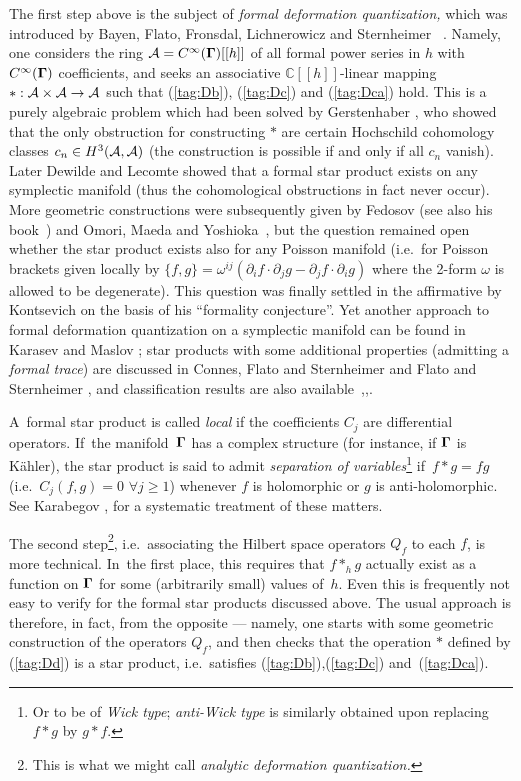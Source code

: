 \documentclass[12pt]{amsart}
\numberwithin{equation}{section}
\theoremstyle{remark}
\newcommand\AAA{{\Cal A}}
\newcommand\Omg{{\bigam}}   %
\newcommand{\CC}{\C}
\newcommand{\bigam}{\mbox{\boldmath $\Gamma$}}
\newcommand{\C}{\mathbb C}
\begin{document}
The first step above is the subject of {\it formal deformation quantization,\/}
which was introduced by Bayen, Flato, Fronsdal, Lichnerowicz and Sternheimer~
\cite{bib:BFFLS}. Namely, one considers the ring $\AAA=C^\infty(\Omg)[[h]]$ of
all formal power series in $h$ with $C^\infty(\Omg)$ coefficients, and seeks an
associative $\CC[[h]]$-linear mapping $*:\AAA\times\AAA\to\AAA$ such that
(\ref{tag:Db}), (\ref{tag:Dc}) and (\ref{tag:Dca}) hold. This is a purely
algebraic problem which had been solved by Gerstenhaber \cite{bib:Gerst}, who
showed that the only obstruction for constructing $*$ are certain Hochschild
cohomology classes $c_n\in H^3(\AAA,\AAA)$ (the construction is possible if and
only if all $c_n$ vanish). Later Dewilde and Lecomte \cite{bib:DewLe} showed
that a formal star product exists on any symplectic manifold (thus the
cohomological obstructions in fact never occur). More geometric constructions
were subsequently given by Fedosov \cite{bib:Fedos} (see also his
book~\cite{bib:FedosBk}) and Omori, Maeda and Yoshioka~\cite{bib:OMY}, but the
question remained open whether the star product exists also for any Poisson
manifold (i.e.~for Poisson brackets given locally by $\{f,g\} = \omega^{ij}
(\partial_i f\cdot\partial_j g - \partial_j f\cdot \partial_i g)$ where the
2-form $\omega$ is allowed to be degenerate). This question was finally settled
in the affirmative by Kontsevich \cite{bib:Kon} on the basis of his ``formality
conjecture''. Yet another approach to formal deformation quantization on a
symplectic manifold can be found in Karasev and Maslov \cite{bib:KMbk}; star
products with some additional properties (admitting a {\it formal trace\/}) are
discussed in Connes, Flato and Sternheimer \cite{bib:FScl} and Flato and
Sternheimer \cite{bib:FSbk}, and classification results are also
available~\cite{bib:BertCG},\cite{bib:Delig},\cite{bib:NTsy}.

A~formal star product is called {\it local\/} if the coefficients $C_j$ are
differential operators. If~the manifold~$\Omg$ has a complex structure (for
instance, if $\Omg$ is K\"ahler), the star product is said to admit {\sl
separation of variables\/}\footnote{Or to be of {\it Wick type\/};
{\it anti-Wick type\/} is similarly obtained upon replacing $f*g$ by $g*f$.}
if~$f*g=fg$ (i.e.~$C_j(f,g)=0$ $\forall j\ge1$) whenever $f$ is holomorphic
or $g$ is anti-holomorphic. See Karabegov \cite{bib:KarA}, \cite{bib:KarB} for
a systematic treatment of these matters.

The second step\footnote{This is what we might call {\it analytic deformation
quantization.\/}}, i.e.~associating the Hilbert space operators $Q_f$ to each
$f$, is more technical. In~the first place, this requires that $f*_h g$
actually exist as a function on $\Omg$ for some (arbitrarily small) values
of~$h$. Even this is frequently not easy to verify for the formal star products
discussed above. The usual approach is therefore, in fact, from the opposite
--- namely, one starts with some geometric construction of the operators $Q_f$,
and then checks that the operation $*$ defined by (\ref{tag:Dd}) is a star
product, i.e.~satisfies (\ref{tag:Db}),(\ref{tag:Dc}) and~(\ref{tag:Dca}).
\end{document}
